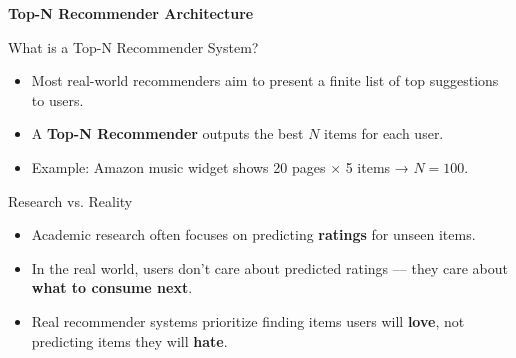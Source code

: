 \documentclass{beamer}
\begin{document}
\begin{frame}[plain]
    \begin{center}
        {\LARGE \textbf{Top-N Recommender Architecture}}
    \end{center}
\end{frame}

\begin{frame}{What is a Top-N Recommender System?}
\begin{itemize}
    \item Most real-world recommenders aim to present a finite list of top suggestions to users.
    \item A \textbf{Top-N Recommender} outputs the best $N$ items for each user.
    \item Example: Amazon music widget shows 20 pages × 5 items → $N = 100$.
\end{itemize}
\end{frame}

\begin{frame}{Research vs. Reality}
\begin{itemize}
    \item Academic research often focuses on predicting \textbf{ratings} for unseen items.
    \item In the real world, users don’t care about predicted ratings — they care about \textbf{what to consume next}.
    \item Real recommender systems prioritize finding items users will \textbf{love}, not predicting items they will \textbf{hate}.
\end{itemize}
\end{frame}
\end{document}
